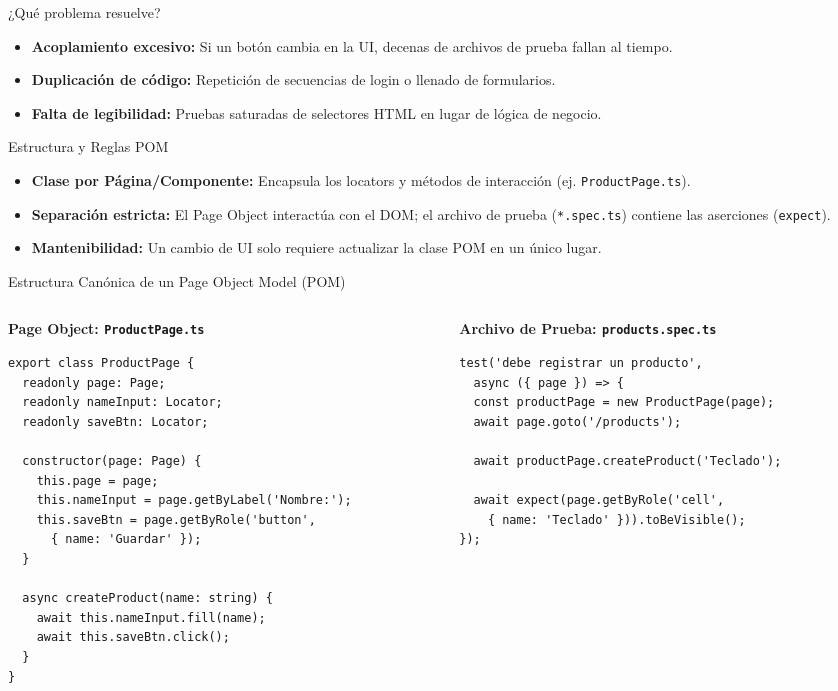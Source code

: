\documentclass[aspectratio=169]{beamer}
\begin{document}
  {¿Qué problema resuelve?}
  {
    {\footnotesize
    \begin{itemize}
      \item \textbf{Acoplamiento excesivo:} Si un botón cambia en la UI, decenas de archivos de prueba fallan al tiempo.
      \item \textbf{Duplicación de código:} Repetición de secuencias de login o llenado de formularios.
      \item \textbf{Falta de legibilidad:} Pruebas saturadas de selectores HTML en lugar de lógica de negocio.
    \end{itemize}
    }
  }
  {Estructura y Reglas POM}
  {
    {\footnotesize
    \begin{itemize}
      \item \textbf{Clase por Página/Componente:} Encapsula los locators y métodos de interacción (ej. \texttt{ProductPage.ts}).
      \item \textbf{Separación estricta:} El Page Object interactúa con el DOM; el archivo de prueba (\texttt{*.spec.ts}) contiene las aserciones (\texttt{expect}).
      \item \textbf{Mantenibilidad:} Un cambio de UI solo requiere actualizar la clase POM en un único lugar.
    \end{itemize}
    }
  }

\begin{frame}[fragile]{Estructura Canónica de un Page Object Model (POM)}
  \begin{columns}[T,onlytextwidth]
    \begin{column}{0.49\textwidth}
      \textbf{\scriptsize\color{cbBlue} Page Object: \texttt{ProductPage.ts}}
      \begin{lstlisting}[style=tslst]
export class ProductPage {
  readonly page: Page;
  readonly nameInput: Locator;
  readonly saveBtn: Locator;

  constructor(page: Page) {
    this.page = page;
    this.nameInput = page.getByLabel('Nombre:');
    this.saveBtn = page.getByRole('button', 
      { name: 'Guardar' });
  }

  async createProduct(name: string) {
    await this.nameInput.fill(name);
    await this.saveBtn.click();
  }
}
      \end{lstlisting}
    \end{column}
    \begin{column}{0.49\textwidth}
      \textbf{\scriptsize\color{cbPurple} Archivo de Prueba: \texttt{products.spec.ts}}
      \begin{lstlisting}[style=tslst]
test('debe registrar un producto', 
  async ({ page }) => {
  const productPage = new ProductPage(page);
  await page.goto('/products');

  await productPage.createProduct('Teclado');

  await expect(page.getByRole('cell', 
    { name: 'Teclado' })).toBeVisible();
});
      \end{lstlisting}
    \end{column}
  \end{columns}
\end{frame}
\end{document}
